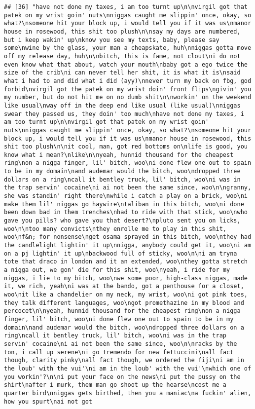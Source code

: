 \documentclass[]{article}
\begin{document}
\begin{verbatim}
## [36] "have not done my taxes, i am too turnt up\n\nvirgil got that patek on my wrist goin' nuts\nniggas caught me slippin' once, okay, so what?\nsomeone hit your block up, i would tell you if it was us\nmanor house in rosewood, this shit too plush\n\nsay my days are numbered, but i keep wakin' up\nknow you see my texts, baby, please say some\nwine by the glass, your man a cheapskate, huh\nniggas gotta move off my release day, huh\n\nbitch, this is fame, not clout\ni do not even know what that about, watch your mouth\nbaby got a ego twice the size of the crib\ni can never tell her shit, it is what it is\nsaid what i had to and did what i did (ayy)\nnever turn my back on fbg, god forbid\nvirgil got the patek on my wrist doin' front flips\ngivin' you my number, but do not hit me on no dumb shit\n\nworkin' on the weekend like usual\nway off in the deep end like usual (like usual)\nniggas swear they passed us, they doin' too much\nhave not done my taxes, i am too turnt up\n\nvirgil got that patek on my wrist goin' nuts\nniggas caught me slippin' once, okay, so what?\nsomeone hit your block up, i would tell you if it was us\nmanor house in rosewood, this shit too plush\n\nit cool, man, got red bottoms on\nlife is good, you know what i mean?\nlike\n\nyeah, hunnid thousand for the cheapest ring\non a nigga finger, lil' bitch, woo\ni done flew one out to spain to be in my domain\nand audemar would the bitch, woo\ndropped three dollars on a ring\ncall it bentley truck, lil' bitch, woo\ni was in the trap servin' cocaine\ni ai not been the same since, woo\n\ngranny, she was standin' right there\nwhile i catch a play on a brick, woo\ni make them lil' niggas go haywire\ntaliban in this bitch, woo\ni done been down bad in them trenches\nhad to ride with that stick, woo\nwho gave you pills? who gave you that desert?\npluto sent you on licks, woo\n\ntoo many convicts\nthey enrolle me to play in this shit, woo\nf&n; for nonsense\nget osama sprayed in this bitch, woo\nthey had the candlelight lightin' it up\nnigga, anybody could get it, woo\ni am on a pj lightin' it up\nbackwood full of sticky, woo\n\ni am tryna tote that draco in london and it an extended, woo\nthey gotta stretch a nigga out, we gon' die for this shit, woo\nyeah, i ride for my niggas, i lie to my bitch, woo\nwe some poor, high-class niggas, made it, we rich, yeah\ni was at the bando, got a penthouse for a closet, woo\nit like a chandelier on my neck, my wrist, woo\ni got pink toes, they talk different languages, woo\ngot promethazine in my blood and percocet\n\nyeah, hunnid thousand for the cheapest ring\non a nigga finger, lil' bitch, woo\ni done flew one out to spain to be in my domain\nand audemar would the bitch, woo\ndropped three dollars on a ring\ncall it bentley truck, lil' bitch, woo\ni was in the trap servin' cocaine\ni ai not been the same since, woo\n\nracks by the ton, i call up serene\ni go tremendo for new fettuccini\nall fact though, clarity pinky\nall fact though, we ordered the fiji\ni am in the loub' with the vui'\ni am in the loub' with the vui'\nwhich one of you workin'?\n\ni put your face on the news\ni put the pussy on the shirt\nafter i murk, them man go shoot up the hearse\ncost me a quarter bird\nniggas gets birthed, then you a maniac\na fuckin' alien, how you spurt\nai not got 
\end{verbatim}
\end{document}
